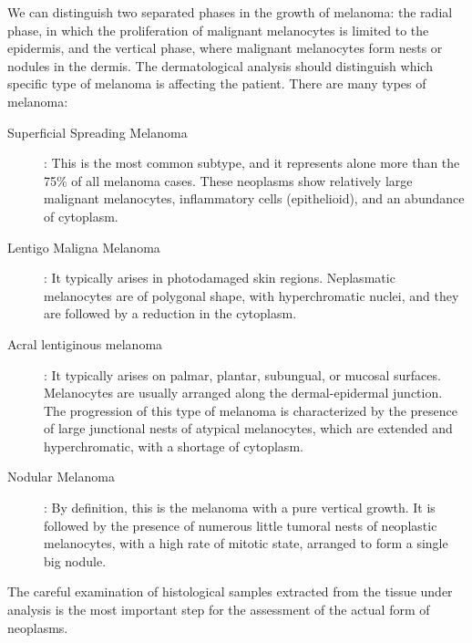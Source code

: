     We can distinguish two separated phases in the growth of melanoma: the radial phase, in which the proliferation of malignant melanocytes is limited to the epidermis, and the vertical phase, where malignant melanocytes form nests or nodules in the dermis. The dermatological analysis should distinguish which specific type of melanoma is affecting the patient. There are many types of melanoma:
    \begin{description}
        \item [Superficial Spreading Melanoma]: This is the most common subtype, and it represents alone more than the 75\% of all melanoma cases. These neoplasms show relatively large malignant melanocytes, inflammatory cells (epithelioid), and an abundance of cytoplasm.

        \item [Lentigo Maligna Melanoma]: It typically arises in photodamaged skin regions. Neplasmatic melanocytes are of polygonal shape, with hyperchromatic nuclei, and they are followed by a reduction in the cytoplasm.

        \item [Acral lentiginous melanoma]: It typically arises on palmar, plantar, subungual, or mucosal surfaces. Melanocytes are usually arranged along the dermal-epidermal junction. The progression of this type of melanoma is characterized by the presence of large junctional nests of atypical melanocytes, which are extended and hyperchromatic, with a shortage of cytoplasm.

        \item [Nodular Melanoma]: By definition, this is the melanoma with a pure vertical growth. It is followed by the presence of numerous little tumoral nests of neoplastic melanocytes, with a high rate of mitotic state, arranged to form a single big nodule.
    \end{description}

    The careful examination of histological samples extracted from the tissue under analysis is the most important step for the assessment of the actual form of neoplasms.
